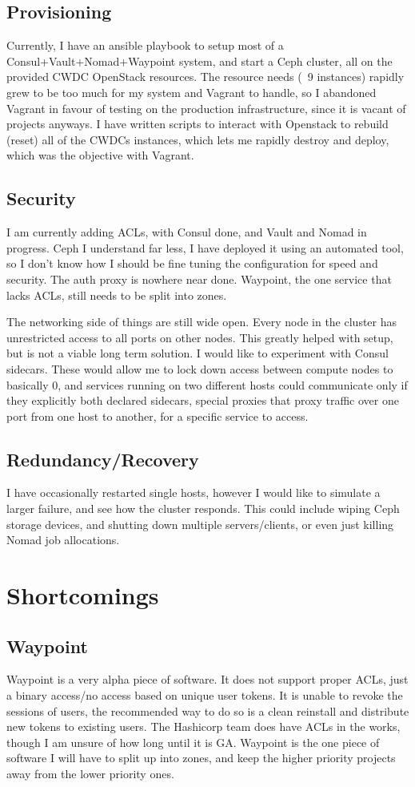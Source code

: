 \documentclass{article}
\begin{document}
\subsection{Provisioning}
Currently, I have an ansible playbook to setup most of a Consul+Vault+Nomad+Waypoint system, and start a Ceph cluster, all on the provided CWDC OpenStack resources. The resource needs (~9 instances) rapidly grew to be too much for my system and Vagrant to handle, so I abandoned Vagrant in favour of testing on the production infrastructure, since it is vacant of projects anyways. I have written scripts to interact with Openstack to rebuild (reset) all of the CWDCs instances, which lets me rapidly destroy and deploy, which was the objective with Vagrant.

\subsection{Security}
I am currently adding ACLs, with Consul done, and Vault and Nomad in progress. Ceph I understand far less, I have deployed it using an automated tool, so I don't know how I should be fine tuning the configuration for speed and security. The auth proxy is nowhere near done. Waypoint, the one service that lacks ACLs, still needs to be split into zones. 


The networking side of things are still wide open. Every node in the cluster has unrestricted access to all ports on other nodes. This greatly helped with setup, but is not a viable long term solution. I would like to experiment with Consul sidecars. These would allow me to lock down access between compute nodes to basically 0, and services running on two different hosts could communicate only if they explicitly both declared sidecars, special proxies that proxy traffic over one port from one host to another, for a specific service to access.
\subsection{Redundancy/Recovery}
I have occasionally restarted single hosts, however I would like to simulate a larger failure, and see how the cluster responds. This could include wiping Ceph storage devices, and shutting down multiple servers/clients, or even just killing Nomad job allocations.

\section{Shortcomings}
\subsection{Waypoint}
Waypoint is a very alpha piece of software. It does not support proper ACLs, just a binary access/no access based on unique user tokens. It is unable to revoke the sessions of users, the recommended way to do so is a clean reinstall and distribute new tokens to existing users. The Hashicorp team does have ACLs in the works, though I am unsure of how long until it is GA. Waypoint is the one piece of software I will have to split up into zones, and keep the higher priority projects away from the lower priority ones. 
\end{document}
